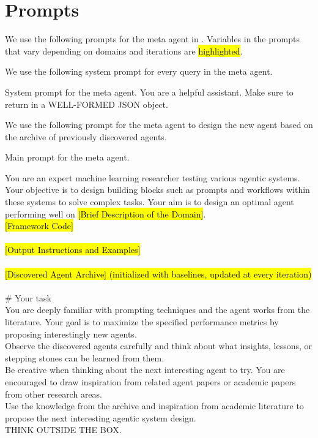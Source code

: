 \section{Prompts}
\label{append_section:prompt}

We use the following prompts for the meta agent in \ouralgo. Variables in the prompts that vary depending on domains and iterations are \hl{highlighted}.

We use the following system prompt for every query in the meta agent.
\begin{mybox}{System prompt for the meta agent.}
\small
You are a helpful assistant. Make sure to return in a WELL-FORMED JSON object.
\end{mybox}

We use the following prompt for the meta agent to design the new agent based on the archive of previously discovered agents.
\begin{mybox}{Main prompt for the meta agent.}
\small

You are an expert machine learning researcher testing various agentic systems. Your objective is to design building blocks such as prompts and workflows within these systems to solve complex tasks. Your aim is to design an optimal agent performing well on \hl{[Brief Description of the Domain]}.\\

\hl{[Framework Code]}\\ \\
\hl{[Output Instructions and Examples]}\\\\
\hl{[Discovered Agent Archive] (initialized with baselines, updated at every iteration)}\\\\

\# Your task \\
You are deeply familiar with prompting techniques and the agent works from the literature. Your goal is to maximize the specified performance metrics by proposing interestingly new agents. \\
Observe the discovered agents carefully and think about what insights, lessons, or stepping stones can be learned from them. \\
Be creative when thinking about the next interesting agent to try. You are encouraged to draw inspiration from related agent papers or academic papers from other research areas. \\
Use the knowledge from the archive and inspiration from academic literature to propose the next interesting agentic system design. \\
THINK OUTSIDE THE BOX.
\end{mybox}

